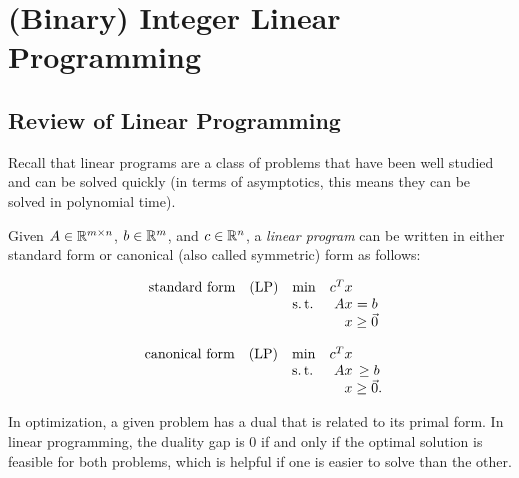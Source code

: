 \section{(Binary) Integer Linear Programming}

\subsection{Review of Linear Programming}

Recall that linear programs are a class of problems that have been well studied and can be solved quickly (in terms of asymptotics, this means they can be solved in polynomial time).

\begin{defn}
\label{defn:dual-program}
    Given $A \in \mathbb R^{m\times n}$, $b \in \mathbb R^m$, and $c \in \mathbb R^n$, a \textit{linear program} can be written in either standard form or canonical (also called symmetric) form as follows:
    \begin{multicols}{2}
    \noindent\begin{equation*}
    \begin{array}{lllr@{}c@{}r@{}l}
    \text{standard form} 
        & \text{(LP)}   & \min  & c^T x &           \\
        &               & \st   & Ax    & {}= b     \\
        &               &       &  x    & {}\ge \Vec{0}
    \end{array}
    \end{equation*}
    
    \noindent\begin{equation*}
    \begin{array}{lllr@{}c@{}r@{}l}
    \text{canonical form} 
        & \text{(LP)}   & \min  & c^T x &           \\
        &               & \st   & Ax    & {}\ge b   \\
        &               &       &  x    & {}\ge \Vec{0}.
    \end{array}
    \end{equation*}
    \end{multicols}
\end{defn}
In optimization, a given problem has a dual that is related to its primal form. In linear programming, the duality gap is 0 if and only if the optimal solution is feasible for both problems, which is helpful if one is easier to solve than the other.

